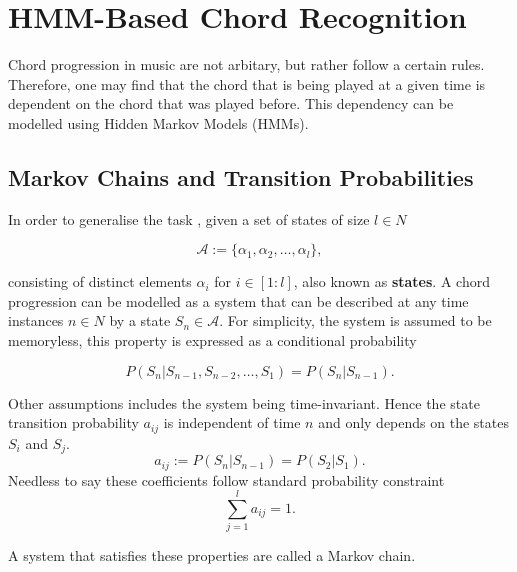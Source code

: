 \documentclass[a4paper, 9pt, twocolumn]{extarticle}
\begin{document}
\section{HMM-Based Chord Recognition}
\label{section:HMM_recognition}
Chord progression in music are not arbitary, but rather follow a certain rules. Therefore, one may find that the chord that is being played at a given time is dependent on the chord that was played before. This dependency can be modelled using Hidden Markov Models (HMMs).
\subsection{Markov Chains and Transition Probabilities}
\label{subsection:Markov_chain}
In order to generalise the task \cite{manning1999foundations}, given a set of states of size $l \in N$

\begin{equation}
    \mathcal{A} := \{\alpha_1, \alpha_2, \ldots, \alpha_l\},
\end{equation}

consisting of distinct elements $\alpha_i$ for $i \in [1:l]$, also known as \textbf{states}.
A chord progression can be modelled as a system that can be described at any time instances $n \in N$ by a state $S_n \in \mathcal{A}$.
For simplicity, the system is assumed to be memoryless, this property is expressed as a conditional probability

\begin{equation}
    P(S_n | S_{n-1}, S_{n-2}, \ldots, S_1) = P(S_n | S_{n-1}).
\end{equation}

Other assumptions includes the system being time-invariant. Hence the state transition probability $a_{ij}$ is independent of time $n$ and only depends on the states $S_i$ and $S_j$. 
\begin{equation}
    a_{ij} := P(S_n | S_{n-1}) = P(S_2 | S_1).
\end{equation}
Needless to say these coefficients follow standard probability constraint
\begin{equation}
    \sum_{j=1}^{l} a_{ij} = 1.
\end{equation}

A system that satisfies these properties are called a Markov chain.
\end{document}
